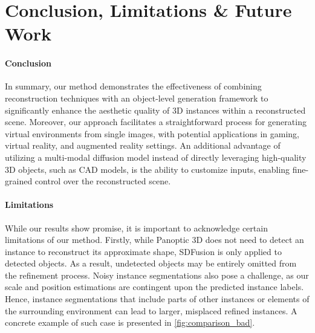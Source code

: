 \section{Conclusion, Limitations \& Future Work}
\label{sec:limitations}

\paragraph{Conclusion}
In summary, our method demonstrates the effectiveness of combining reconstruction techniques with an object-level generation framework to significantly enhance the aesthetic quality of 3D instances within a reconstructed scene.
Moreover, our approach facilitates a straightforward process for generating virtual environments from single images, with potential applications in gaming, virtual reality, and augmented reality settings.
An additional advantage of utilizing a multi-modal diffusion model instead of directly leveraging high-quality 3D objects, such as CAD models, is the ability to customize inputs, enabling fine-grained control over the reconstructed scene.

\paragraph{Limitations}
While our results show promise, it is important to acknowledge certain limitations of our method.
Firstly, while Panoptic 3D does not need to detect an instance to reconstruct its approximate shape, SDFusion is only applied to detected objects.
As a result, undetected objects may be entirely omitted from the refinement process.
Noisy instance segmentations also pose a challenge, as our scale and position estimations are contingent upon the predicted instance labels.
Hence, instance segmentations that include parts of other instances or elements of the surrounding environment can lead to larger, misplaced refined instances.
A concrete example of such case is presented in \cref{fig:comparison_bad}.

